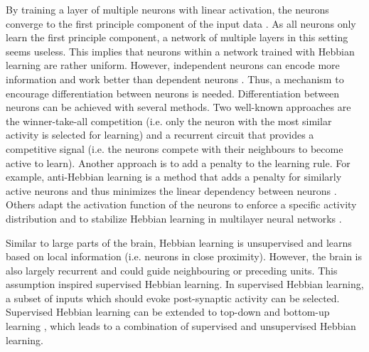 By training a layer of multiple neurons with linear activation, the neurons converge to the first principle component of the input data \cite{Oja_1982}.
As all neurons only learn the first principle component, a network of multiple layers in this setting seems useless. This implies that neurons within a network trained with Hebbian learning are rather uniform.
However, independent neurons can encode more information and work better than dependent neurons .
Thus, a mechanism to encourage differentiation between neurons is needed.
Differentiation between neurons can be achieved with several methods.
Two well-known approaches are the winner-take-all competition (i.e. only the neuron with the most similar activity is selected for learning) and a recurrent circuit that provides a competitive signal (i.e. the neurons compete with their neighbours to become active to learn).
Another approach is to add a penalty to the learning rule.
For example, anti-Hebbian learning is a method that adds a penalty for similarly active neurons and thus minimizes the linear dependency between neurons .
Others adapt the activation function of the neurons to enforce a specific activity distribution and to stabilize Hebbian learning in multilayer neural networks .

Similar to large parts of the brain, Hebbian learning is unsupervised and learns based on local information (i.e. neurons in close proximity).
However, the brain is also largely recurrent and could guide neighbouring or preceding units.
This assumption inspired supervised Hebbian learning.
In supervised Hebbian learning, a subset of inputs which should evoke post-synaptic activity can be selected.
Supervised Hebbian learning can be extended to top-down and bottom-up learning , which leads to a combination of supervised and unsupervised Hebbian learning.











